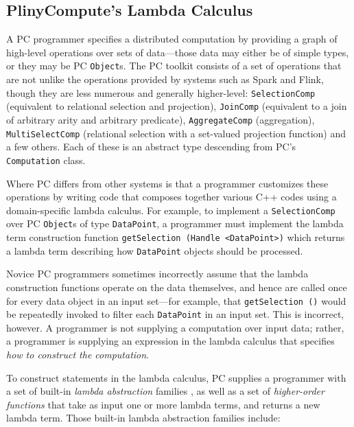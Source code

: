 \subsection{PlinyCompute's Lambda Calculus}
A PC programmer specifies a distributed computation by providing a graph of high-level operations over sets of data---those data
may either be of simple types, or they may be
PC \texttt{Object}s. The PC toolkit consists of a set of
operations 
that are not unlike the operations provided by systems such as Spark and Flink, though they are less numerous and generally higher-level:
\texttt{SelectionComp} (equivalent to relational selection and projection), \texttt{JoinComp} (equivalent to a join of arbitrary arity and arbitrary predicate), 
\texttt{AggregateComp} (aggregation), \texttt{MultiSelectComp} (relational selection with a set-valued projection function) and a few others.  
Each of these is an abstract type descending from PC's \texttt{Computation} class.

Where PC differs from other systems is that a programmer customizes these operations by writing code that composes together various C++ codes 
using a 
domain-specific lambda calculus.
For example, to implement a \texttt{SelectionComp} over PC \texttt{Object}s of type \texttt{DataPoint}, a programmer
must implement the lambda term construction function \texttt{getSelection (Handle <DataPoint>)} which returns a lambda term
describing how \texttt{DataPoint} objects
should be processed.

Novice PC programmers sometimes incorrectly assume that the lambda construction functions operate on the data themselves, and
hence are called once for every data object in an input set---for example, 
that
\texttt{getSelection ()} would be repeatedly invoked to filter each \texttt{DataPoint} in an input set.  
This is incorrect, however.
A programmer is not supplying a computation over input data; rather, a programmer is supplying an expression in the lambda calculus that 
specifies \emph{how to construct the computation}.

To construct statements in the lambda calculus, PC supplies a programmer with a set of built-in \emph{lambda abstraction} 
families \cite{miller1991logic}, as 
well as a set of \emph{higher-order functions} \cite{chen1993hilog}
that take as input one or more lambda terms, and returns a new lambda term.  Those built-in lambda abstraction families 
include:

